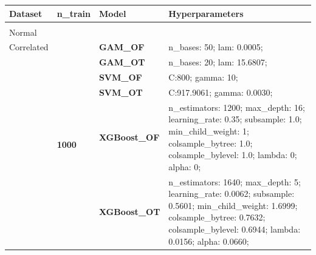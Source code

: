 \documentclass[runningheads]{llncs}
\begin{document}
\begin{table}
    \scriptsize
    \begin{tabularx}{\textwidth}{>{\RaggedRight\arraybackslash}m{1.6cm}p{1.225cm}p{2.05cm}>{\RaggedRight\arraybackslash}X}
        \toprule
        \textbf{Dataset}                        & \textbf{n\_train}                 & \textbf{Model}       & \textbf{Hyperparameters}                                                                                                                                                                          \\
        \midrule
        \multirow[t]{14}{=}{\textbf{Simple                                                                                                                                                                                                                                                                     \\Normal\\Correlated}} & \multirow[t]{7}{*}{\textbf{1000}} & \textbf{GAM\_OF} & n\_bases: 50; lam: 0.0005;  \\
        \textbf{}                               & \textbf{}                         & \textbf{GAM\_OT}     & n\_bases: 20; lam: 15.6807;                                                                                                                                                                       \\
        \textbf{}                               & \textbf{}                         & \textbf{SVM\_OF}     & C:\@800; gamma: 10;                                                                                                                                                                                \\
        \textbf{}                               & \textbf{}                         & \textbf{SVM\_OT}     & C:\@917.9061; gamma: 0.0030;                                                                                                                                                                       \\
        \textbf{}                               & \textbf{}                         & \textbf{XGBoost\_OF} & n\_estimators: 1200; max\_depth: 16; learning\_rate: 0.35; subsample: 1.0; min\_child\_weight: 1; colsample\_bytree: 1.0; colsample\_bylevel: 1.0; lambda: 0; alpha: 0;                           \\
        \textbf{}                               & \textbf{}                         & \textbf{XGBoost\_OT} & n\_estimators: 1640; max\_depth: 5; learning\_rate: 0.0062; subsample: 0.5601; min\_child\_weight: 1.6999; colsample\_bytree: 0.7632; colsample\_bylevel: 0.6944; lambda: 0.0156; alpha: 0.0660;  \\

\end{tabularx}
\end{table}
\end{document}
